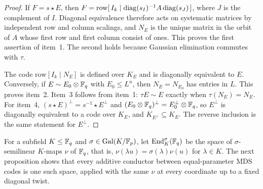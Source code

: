 \begin{proof}
If \(F=s\star E\), then
\(F=\mathrm{row}[\,I_k\mid\operatorname{diag}(s_I)^{-1}A\operatorname{diag}(s_J)\,]\), where \(J\) is
the complement of \(I\).  Diagonal equivalence therefore acts on systematic
matrices by independent row and column scalings, and \(N_E\) is the unique
matrix in the orbit of \(A\) whose first row and first column consist of
ones.  This proves the first assertion of item~1.  The second holds because
Gaussian elimination commutes with \(\tau\).

The code \(\mathrm{row}[I_k\mid N_E]\) is defined over \(K_E\) and is
diagonally equivalent to \(E\).  Conversely, if \(E\sim E_0\otimes\mathbb F_q\) with
\(E_0\leq L^n\), then \(N_E=N_{E_0}\) has entries in \(L\).  This proves
item~2.  Item~3 follows from item~1: \(\tau E\sim E\) exactly when
\(\tau(N_E)=N_E\).  For item~4, \((s\star E)^\perp=s^{-1}\star E^\perp\) and
\((E_0\otimes\mathbb F_q)^\perp=E_0^\perp\otimes\mathbb F_q\), so \(E^\perp\) is
diagonally equivalent to a code over \(K_E\), and \(K_{E^\perp}\subseteq
K_E\).  The reverse inclusion is the same statement for \(E^\perp\).
\end{proof}

For a subfield \(K\leq\mathbb F_q\) and \(\sigma\in\mathrm{Gal}(K/\mathbb F_p)\), let
\(\operatorname{End}_K^\sigma(\mathbb F_q)\) be the space of \(\sigma\)-semilinear \(K\)-maps
\(\nu\) of \(\mathbb F_q\), that is, \(\nu(\lambda u)=\sigma(\lambda)\nu(u)\) for
\(\lambda\in K\).  The next proposition shows that every additive conductor
between equal-parameter MDS codes is one such space, applied with the same
\(\nu\) at every coordinate up to a fixed diagonal twist.


